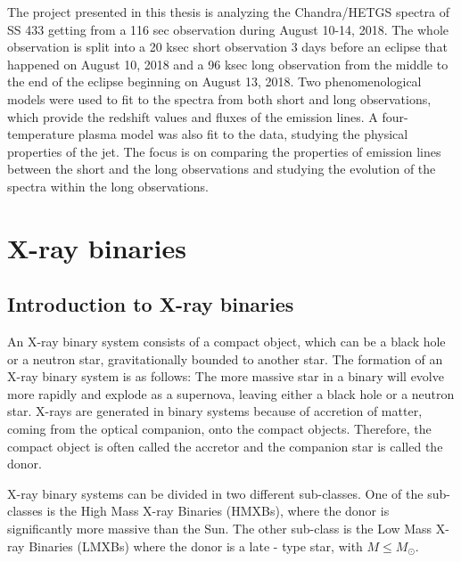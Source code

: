 The project presented in this thesis is analyzing the Chandra/HETGS spectra of SS 433 getting from a 116 sec observation during August 10-14, 2018. The whole observation is split into a 20 ksec short observation 3 days before an eclipse that happened on August 10, 2018 and a 96 ksec long observation from the middle to the end of the eclipse beginning on August 13, 2018. Two phenomenological models were used to fit to the spectra from both short and long observations, which provide the redshift values and fluxes of the emission lines. A four-temperature plasma model was also fit to the data, studying the physical properties of the jet. The focus is on comparing the properties of emission lines between the short and the long observations and studying the evolution of the spectra within the long observations.





\section{X-ray binaries}
\subsection{Introduction to X-ray binaries}
An X-ray binary system consists of a compact object, which can be a black hole or a neutron star, gravitationally bounded to another star. The formation of an X-ray binary system is as follows: The more massive star in a binary will evolve more rapidly and explode as a supernova, leaving either a black hole or a neutron star. X-rays are generated in binary systems because of accretion of matter, coming from the optical companion, onto the compact objects. Therefore, the compact object is often called the accretor and the companion star is called the donor. \par 

X-ray binary systems can be divided in two different sub-classes. One of the sub-classes is the High Mass X-ray Binaries (HMXBs), where the donor is significantly more massive than the Sun. The other sub-class is the Low Mass X-ray Binaries (LMXBs) where the donor is a late - type star, with $M \leq M_\odot$. 

